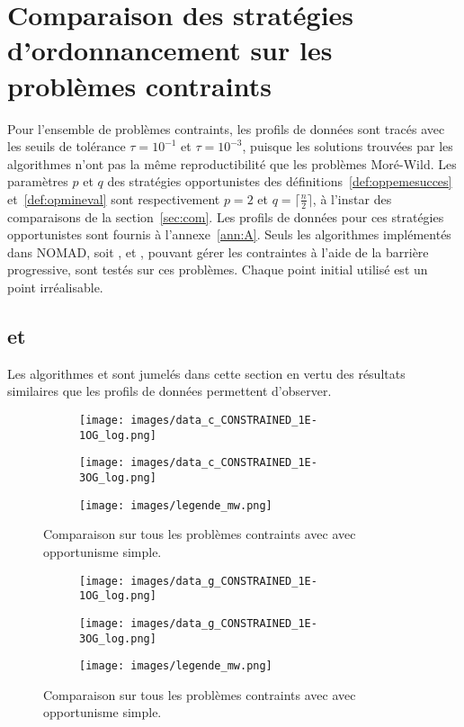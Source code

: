 \section{Comparaison des stratégies d'ordonnancement sur les problèmes contraints}\label{sec:com2}
Pour l'ensemble de problèmes contraints, les profils de données sont tracés avec les seuils de tolérance $\tau = 10^{-1}$ et $\tau = 10^{-3}$, puisque les solutions trouvées par les algorithmes n'ont pas la même reproductibilité que les problèmes Moré-Wild. Les paramètres $p$ et $q$ des stratégies opportunistes des définitions~\ref{def:oppemesucces} et~\ref{def:opmineval} sont respectivement $p=2$ et $q = \lceil\frac{n}{2}\rceil$, à l'instar des comparaisons de la section~\ref{sec:com}. Les profils de données pour ces stratégies opportunistes sont fournis à l'annexe~\ref{ann:A}. Seuls les algorithmes implémentés dans NOMAD, soit \CS, \GPS et \MADS, pouvant gérer les contraintes à l'aide de la barrière progressive, sont testés sur ces problèmes. Chaque point initial utilisé est un point irréalisable.
\subsection{\CS et \GPS}\label{sec:cs_gps_const}
Les algorithmes \CS et \GPS sont jumelés dans cette section en vertu des résultats similaires que les profils de données permettent d'observer.

\begin{figure}[!htb]
	\centering
	\begin{subfigure}{0.43\textwidth}
		\texttt{[image: images/data\_c\_CONSTRAINED\_1E-1OG\_log.png]}
	\end{subfigure}%
	\begin{subfigure}{0.43\textwidth}
		\texttt{[image: images/data\_c\_CONSTRAINED\_1E-3OG\_log.png]}
	\end{subfigure}
	\smallskip
	\begin{subfigure}{0.95\textwidth}
		\texttt{[image: images/legende\_mw.png]}
	\end{subfigure}
	\caption{Comparaison sur tous les problèmes contraints avec \CS avec opportunisme simple.}
	\label{fig:cs_const_og}
\end{figure}
\begin{figure}[!htb]
	\centering
	\begin{subfigure}{0.43\textwidth}
		\texttt{[image: images/data\_g\_CONSTRAINED\_1E-1OG\_log.png]}
	\end{subfigure}%
	\begin{subfigure}{0.43\textwidth}
		\texttt{[image: images/data\_g\_CONSTRAINED\_1E-3OG\_log.png]}
	\end{subfigure}
	\smallskip
	\begin{subfigure}{0.95\textwidth}
		\texttt{[image: images/legende\_mw.png]}
	\end{subfigure}
	\caption{Comparaison sur tous les problèmes contraints avec \GPS avec opportunisme simple.}
	\label{fig:gps_const_og}
\end{figure}

